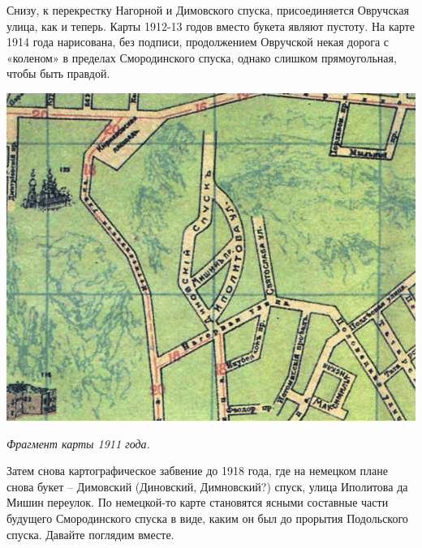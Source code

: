 Снизу, к перекрестку Нагорной и Димовского спуска, присоединяется Овручская улица, как и теперь. Карты 1912-13 годов вместо букета являют пустоту. На карте 1914 года нарисована, без подписи, продолжением Овручской некая дорога с «коленом» в пределах Смородинского спуска, однако слишком прямоугольная, чтобы быть правдой.

\begin{center}
\includegraphics[width=\linewidth]{chast-zmiy/karta-opis/1911-smor-map-pal.png}

\textit{Фрагмент карты 1911 года.}
\end{center}

Затем снова картографическое забвение до 1918 года, где на немецком плане снова букет – Димовский (Диновский, Димновский?) спуск, улица Иполитова да Мишин переулок. По немецкой-то карте становятся ясными составные части будущего Смородинского спуска в виде, каким он был до прорытия Подольского спуска. Давайте поглядим вместе.

